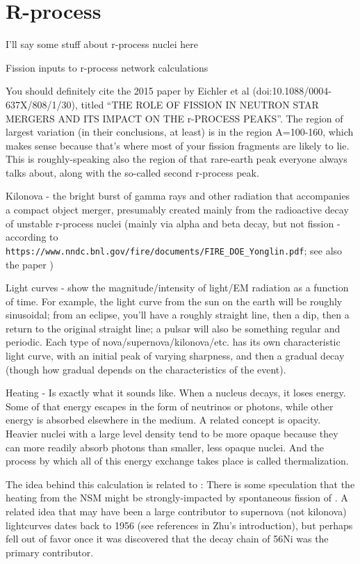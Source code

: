 \chapter{R-process}\label{chap:rprocess}

I'll say some stuff about r-process nuclei here

Fission inputs to r-process network calculations

You should definitely cite the 2015 paper by Eichler et al (doi:10.1088/0004-637X/808/1/30), titled ``THE ROLE OF FISSION IN NEUTRON STAR MERGERS AND ITS IMPACT ON THE r-PROCESS PEAKS''. The region of largest variation (in their conclusions, at least) is in the region A=100-160, which makes sense because that's where most of your fission fragments are likely to lie. This is roughly-speaking also the region of that rare-earth peak everyone always talks about, along with the so-called second r-process peak.

Kilonova - the bright burst of gamma rays and other radiation that accompanies a compact object merger, presumably created mainly from the radioactive decay of unstable r-process nuclei (mainly via alpha and beta decay, but not fission - according to \verb|https://www.nndc.bnl.gov/fire/documents/FIRE_DOE_Yonglin.pdf|; see also the paper \cite{Zhu2018})

Light curves - show the magnitude/intensity of light/EM radiation as a function of time. For example, the light curve from the sun on the earth will be roughly sinusoidal; from an eclipse, you'll have a roughly straight line, then a dip, then a return to the original straight line; a pulsar will also be something regular and periodic. Each type of nova/supernova/kilonova/etc. has its own characteristic light curve, with an initial peak of varying sharpness, and then a gradual decay (though how gradual depends on the characteristics of the event).

Heating - Is exactly what it sounds like. When a nucleus decays, it loses energy. Some of that energy escapes in the form of neutrinos or photons, while other energy is absorbed elsewhere in the medium. A related concept is opacity. Heavier nuclei with a large level density tend to be more opaque because they can more readily absorb photons than smaller, less opaque nuclei. And the process by which all of this energy exchange takes place is called thermalization.

The idea behind this {\Cf} calculation is related to \cite{Zhu2018}: There is some speculation that the heating from the NSM might be strongly-impacted by spontaneous fission of {\Cf}. A related idea that {\Cf} may have been a large contributor to supernova (not kilonova) lightcurves dates back to 1956 (see references in Zhu's introduction), but perhaps fell out of favor once it was discovered that the decay chain of 56Ni was the primary contributor.

